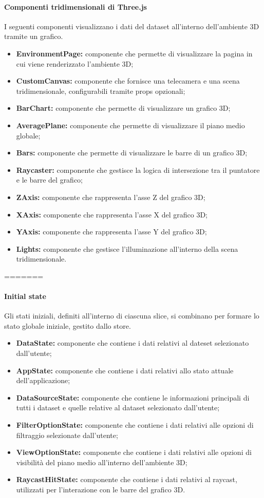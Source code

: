 \paragraph{Componenti tridimensionali di Three.js}
    I seguenti componenti visualizzano i dati del dataset all'interno dell'ambiente 3D tramite un grafico.
    \begin{itemize}
        \item \textbf{EnvironmentPage:} componente che permette di visualizzare la pagina in cui viene renderizzato l'ambiente 3D;
        \item \textbf{CustomCanvas:} componente che fornisce una telecamera e una scena tridimensionale, configurabili tramite props opzionali;
        \item \textbf{BarChart:} componente che permette di visualizzare un grafico 3D;
        \item \textbf{AveragePlane:} componente che permette di visualizzare il piano medio globale;
        \item \textbf{Bars:} componente che permette di visualizzare le barre di un grafico 3D;
        \item \textbf{Raycaster:} componente che gestisce la logica di intersezione tra il puntatore e le barre del grafico;
        \item \textbf{ZAxis:} componente che rappresenta l'asse Z del grafico 3D;
        \item \textbf{XAxis:} componente che rappresenta l'asse X del grafico 3D;
        \item \textbf{YAxis:} componente che rappresenta l'asse Y del grafico 3D;
        \item \textbf{Lights:} componente che gestisce l'illuminazione all'interno della scena tridimensionale.
    \end{itemize}
=======
\paragraph{Initial state}
Gli stati iniziali, definiti all'interno di ciascuna slice, si combinano per
formare lo stato globale iniziale, gestito dallo store.
\begin{itemize}
    \item \textbf{DataState:} componente che contiene i dati relativi al dateset selezionato dall'utente;
    \item \textbf{AppState:} componente che contiene i dati relativi allo stato attuale dell'applicazione;
    \item \textbf{DataSourceState:} componente che contiene le informazioni principali di tutti i dataset e quelle relative al dataset selezionato dall'utente;
    \item \textbf{FilterOptionState:} componente che contiene i dati relativi alle opzioni di filtraggio selezionate dall'utente;
    \item \textbf{ViewOptionState:} componente che contiene i dati relativi alle opzioni di visibilità del piano medio all'interno dell'ambiente 3D;
    \item \textbf{RaycastHitState:} componente che contiene i dati relativi al raycast, utilizzati per l'interazione con le barre del grafico 3D.
\end{itemize}
